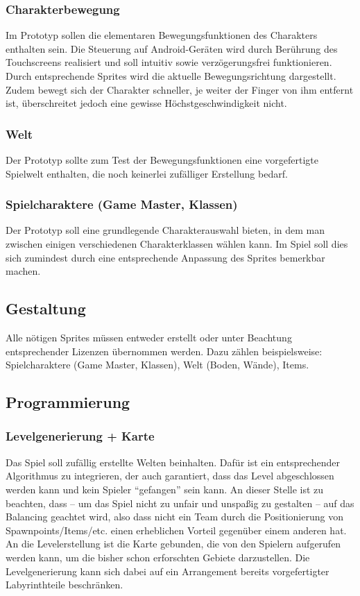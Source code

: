 \documentclass[10pt,a4paper,notitlepage]{report}
\begin{document}
\begin{flushleft}
\subsubsection{Charakterbewegung}
Im Prototyp sollen die elementaren Bewegungsfunktionen des Charakters enthalten sein. Die Steuerung auf Android-Geräten wird durch Berührung des Touchscreens realisiert und soll intuitiv sowie verzögerungsfrei funktionieren. Durch entsprechende Sprites wird die aktuelle Bewegungsrichtung dargestellt. Zudem bewegt sich der Charakter schneller, je weiter der Finger von ihm entfernt ist, überschreitet jedoch eine gewisse Höchstgeschwindigkeit nicht.

\subsubsection{Welt}
Der Prototyp sollte zum Test der Bewegungsfunktionen eine vorgefertigte Spielwelt enthalten, die noch keinerlei zufälliger Erstellung bedarf.

\subsubsection{Spielcharaktere (Game Master, Klassen)}
Der Prototyp soll eine grundlegende Charakterauswahl bieten, in dem man zwischen einigen verschiedenen Charakterklassen wählen kann. Im Spiel soll dies sich zumindest durch eine entsprechende Anpassung des Sprites bemerkbar machen.

\subsection{Gestaltung}
Alle nötigen Sprites müssen entweder erstellt oder unter Beachtung entsprechender Lizenzen übernommen werden. Dazu zählen beispielsweise: Spielcharaktere (Game Master, Klassen), Welt (Boden, Wände), Items.

\subsection{Programmierung}

\subsubsection{Levelgenerierung + Karte}
Das Spiel soll zufällig erstellte Welten beinhalten. Dafür ist ein entsprechender Algorithmus zu integrieren, der auch garantiert, dass das Level abgeschlossen werden kann und kein Spieler \enquote{gefangen} sein kann. An dieser Stelle ist zu beachten, dass – um das Spiel nicht zu unfair und unspaßig zu gestalten – auf das Balancing geachtet wird, also dass nicht ein Team durch die Positionierung von Spawnpoints/Items/etc. einen erheblichen Vorteil gegenüber einem anderen hat. An die Levelerstellung ist die Karte gebunden, die von den Spielern aufgerufen werden kann, um die bisher schon erforschten Gebiete darzustellen. Die Levelgenerierung kann sich dabei auf ein Arrangement bereits vorgefertigter Labyrinthteile beschränken.


\end{flushleft}
\end{document}
